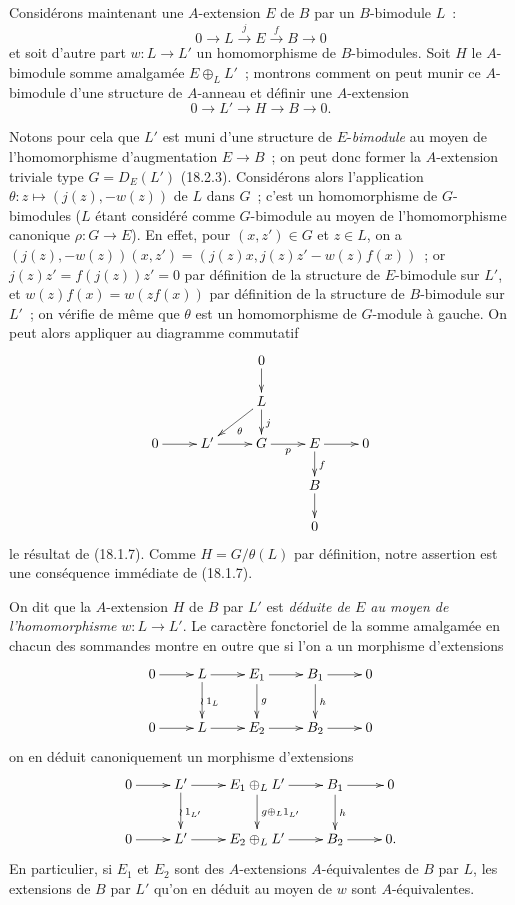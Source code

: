 \begin{env}[18.2.8]
\label{0.18.2.8-fr}
Considérons maintenant une $A$-extension $E$ de $B$ par un $B$-bimodule
$L$~:
\[
  0\longrightarrow L\xrightarrow{j}E\xrightarrow{f}B\longrightarrow0
\]
et soit d'autre part $w:L\to L'$ un homomorphisme de $B$-bimodules. Soit $H$
le $A$-bimodule somme amalgamée $E\oplus_LL'$~; montrons comment on peut munir
ce $A$-bimodule d'une structure de $A$-anneau et définir une $A$-extension
\[
  0\longrightarrow L'\longrightarrow H\longrightarrow B\longrightarrow0.
\]

Notons pour cela que $L'$ est muni d'une structure de $E$-\emph{bimodule} au
moyen de l'homomorphisme d'augmentation $E\to B$~; on peut donc former la
$A$-extension triviale type $G=D_E(L')$ (18.2.3). Considérons alors
l'application $\theta:z\mapsto(j(z),-w(z))$ de $L$ dans $G$~; c'est un
homomorphisme de $G$-bimodules ($L$ étant considéré comme $G$-bimodule au
moyen de l'homomorphisme canonique $\rho:G\to E$). En effet, pour
$(x,z')\in G$ et $z\in L$, on a
$(j(z),-w(z))(x,z')=(j(z)x,j(z)z'-w(z)f(x))$~; or
$j(z)z'=f(j(z))z'=0$ par définition de la structure de $E$-bimodule sur
$L'$, et $w(z)f(x)=w(zf(x))$ par définition de la structure de $B$-bimodule
sur $L'$~; on vérifie de même que $\theta$ est un homomorphisme de
$G$-module à gauche. On peut alors appliquer au diagramme commutatif
\[
  \xymatrix@C=2pc@R=1.4pc{
    & & 0\ar[d] & & \\
    & & L\ar[ld]^\theta\ar[d]^j & & \\
    0\ar[r] & L'\ar[r] & G\ar[r]_p & E\ar[r]\ar[d]^f & 0\\
    & & & B\ar[d] & \\
    & & & 0 &
  }
\]
le résultat de (18.1.7). Comme $H=G/\theta(L)$ par définition, notre
assertion est une conséquence immédiate de (18.1.7).


On dit que la $A$-extension $H$ de $B$ par $L'$ est \emph{déduite de $E$ au
moyen de l'homomorphisme} $w:L\to L'$. Le caractère fonctoriel de la somme
amalgamée en chacun des sommandes montre en outre que si l'on a un morphisme
d'extensions
\[
  \xymatrix{
    0\ar[r] & L\ar[r]\ar[d]^{1_L}\ar@{}[d]|{\wr}
      & E_1\ar[r]\ar[d]^g & B_1\ar[r]\ar[d]^h & 0\\
    0\ar[r] & L\ar[r] & E_2\ar[r] & B_2\ar[r] & 0
  }
\]
on en déduit canoniquement un morphisme d'extensions
\[
  \xymatrix{
    0\ar[r] & L'\ar[r]\ar[d]^{1_{L'}}\ar@{}[d]|{\wr}
      & E_1\oplus_LL'\ar[r]\ar[d]^{g\oplus_L1_{L'}}
      & B_1\ar[r]\ar[d]^h & 0\\
    0\ar[r] & L'\ar[r] & E_2\oplus_LL'\ar[r] & B_2\ar[r] & 0.
  }
\]
En particulier, si $E_1$ et $E_2$ sont des $A$-extensions $A$-équivalentes de
$B$ par $L$, les extensions de $B$ par $L'$ qu'on en déduit au moyen de $w$
sont $A$-équivalentes.


\end{env}
